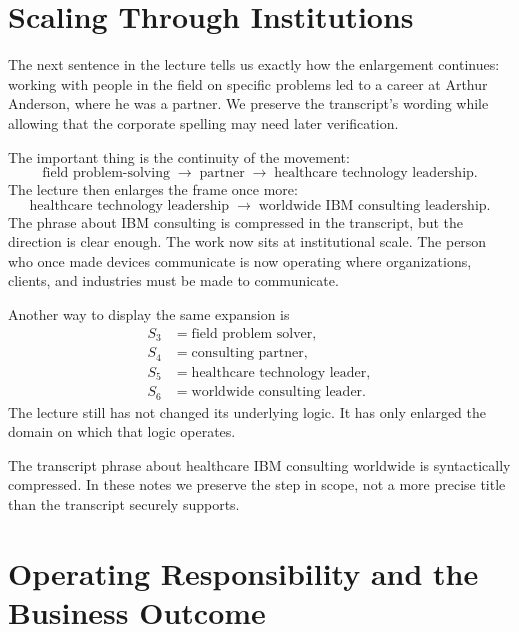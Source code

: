 \section{Scaling Through Institutions}

The next sentence in the lecture tells us exactly how the enlargement continues: working with people in the field on specific problems led to a career at Arthur Anderson, where he was a partner. We preserve the transcript's wording while allowing that the corporate spelling may need later verification.

The important thing is the continuity of the movement:
\begin{equation}
\text{field problem-solving}
\;\to\;
\text{partner}
\;\to\;
\text{healthcare technology leadership}.
\end{equation}
The lecture then enlarges the frame once more:
\begin{equation}
\text{healthcare technology leadership}
\;\to\;
\text{worldwide IBM consulting leadership}.
\end{equation}
The phrase about IBM consulting is compressed in the transcript, but the direction is clear enough. The work now sits at institutional scale. The person who once made devices communicate is now operating where organizations, clients, and industries must be made to communicate.

Another way to display the same expansion is
\begin{align}
S_3 &= \text{field problem solver}, \\
S_4 &= \text{consulting partner}, \\
S_5 &= \text{healthcare technology leader}, \\
S_6 &= \text{worldwide consulting leader}.
\end{align}
The lecture still has not changed its underlying logic. It has only enlarged the domain on which that logic operates.

\begin{remark}
The transcript phrase about healthcare IBM consulting worldwide is syntactically compressed. In these notes we preserve the step in scope, not a more precise title than the transcript securely supports.
\end{remark}

\section{Operating Responsibility and the Business Outcome}

